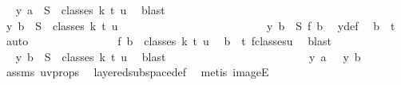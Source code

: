 \begin{isabellebody}
\ \isamarkupfalse%
\ {\isachardoublequoteopen}y\ a\ {\isasymin}\ S\ {\isacharbackquote}{\kern0pt}\ classes\ k\ t\ u{\isachardoublequoteclose}\ \isamarkupfalse%
\ blast\isanewline
\ \ \ \ \ \ \ \ \ \ \isamarkupfalse%
\isanewline
\ \ \ \ \ \ \ \ \ \ \isamarkupfalse%
\ \isamarkupfalse%
\ {\isachardoublequoteopen}y\ b\ {\isasymin}\ S\ {\isacharbackquote}{\kern0pt}\ classes\ k\ t\ u{\isachardoublequoteclose}\isanewline
\ \ \ \ \ \ \ \ \ \ \isamarkupfalse%
\ {\isacharminus}{\kern0pt}\isanewline
\ \ \ \ \ \ \ \ \ \ \ \ \isamarkupfalse%
\ {\isachardoublequoteopen}y\ b\ {\isacharequal}{\kern0pt}\ S\ {\isacharparenleft}{\kern0pt}{\isacharquery}{\kern0pt}f\ b{\isacharparenright}{\kern0pt}{\isachardoublequoteclose}\ \isamarkupfalse%
\ y{\isacharunderscore}{\kern0pt}def\ \isamarkupfalse%
\ {\isacartoucheopen}b\ {\isacharless}{\kern0pt}\ t{\isacartoucheclose}\ \isamarkupfalse%
\ auto\isanewline
\ \ \ \ \ \ \ \ \ \ \ \ \isamarkupfalse%
\ \isamarkupfalse%
\ {\isachardoublequoteopen}{\isacharquery}{\kern0pt}f\ b\ {\isasymin}\ classes\ k\ t\ u{\isachardoublequoteclose}\ \isamarkupfalse%
\ {\isacartoucheopen}b\ {\isacharless}{\kern0pt}\ t{\isacartoucheclose}\ f{\isacharunderscore}{\kern0pt}classes{\isacharunderscore}{\kern0pt}u\ \isamarkupfalse%
\ blast\isanewline
\ \ \ \ \ \ \ \ \ \ \ \ \isamarkupfalse%
\ \isamarkupfalse%
\ {\isachardoublequoteopen}y\ b\ {\isasymin}\ S\ {\isacharbackquote}{\kern0pt}\ classes\ k\ t\ u{\isachardoublequoteclose}\ \isamarkupfalse%
\ blast\isanewline
\ \ \ \ \ \ \ \ \ \ \isamarkupfalse%
\isanewline
\ \ \ \ \ \ \ \ \ \ \isamarkupfalse%
\ \isamarkupfalse%
\ {\isachardoublequoteopen}{\isasymchi}\ {\isacharparenleft}{\kern0pt}y\ a{\isacharparenright}{\kern0pt}\ {\isacharequal}{\kern0pt}\ {\isasymchi}\ {\isacharparenleft}{\kern0pt}y\ b{\isacharparenright}{\kern0pt}{\isachardoublequoteclose}\ \isamarkupfalse%
\ assms{\isacharparenleft}{\kern0pt}{}{\isacharparenright}{\kern0pt}\ uv{\isacharunderscore}{\kern0pt}props\ \isamarkupfalse%
\ layered{\isacharunderscore}{\kern0pt}subspace{\isacharunderscore}{\kern0pt}def\ \isamarkupfalse%
\ {\isacharparenleft}{\kern0pt}metis\ imageE{\isacharparenright}{\kern0pt}\isanewline
\ \ \ \ \ \ \ \ \ \ \isamarkupfalse%

\end{isabellebody}
